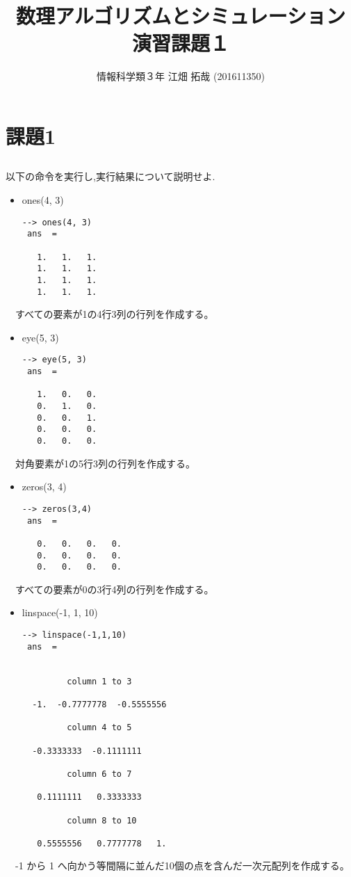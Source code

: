 \documentclass{scrartcl}
\author{情報科学類３年 江畑 拓哉 (201611350)}
\date{}
\title{数理アルゴリズムとシミュレーション\\\medskip
\large 演習課題１}
\begin{document}
\maketitle

\section{課題1}
\label{sec:orgecc3e2e}
\subsection{}
\label{sec:orgdd7a2fb}
以下の命令を実行し,実行結果について説明せよ.\\
\begin{itemize}
\item ones(4, 3)\\
\begin{verbatim}
--> ones(4, 3)
 ans  =

   1.   1.   1.
   1.   1.   1.
   1.   1.   1.
   1.   1.   1.
\end{verbatim}
\end{itemize}
　すべての要素が1の4行3列の行列を作成する。\\
\begin{itemize}
\item eye(5, 3)\\
\begin{verbatim}
--> eye(5, 3)
 ans  =

   1.   0.   0.
   0.   1.   0.
   0.   0.   1.
   0.   0.   0.
   0.   0.   0.
\end{verbatim}
\end{itemize}
　対角要素が1の5行3列の行列を作成する。\\
\begin{itemize}
\item zeros(3, 4)\\
\begin{verbatim}
--> zeros(3,4)
 ans  =

   0.   0.   0.   0.
   0.   0.   0.   0.
   0.   0.   0.   0.
\end{verbatim}
\end{itemize}
　すべての要素が0の3行4列の行列を作成する。\\
\begin{itemize}
\item linspace(-1, 1, 10)\\
\begin{verbatim}
--> linspace(-1,1,10)
 ans  =


         column 1 to 3

  -1.  -0.7777778  -0.5555556

         column 4 to 5

  -0.3333333  -0.1111111

         column 6 to 7

   0.1111111   0.3333333

         column 8 to 10

   0.5555556   0.7777778   1.
\end{verbatim}
\end{itemize}
　-1 から 1 へ向かう等間隔に並んだ10個の点を含んだ一次元配列を作成する。\\
\end{document}
